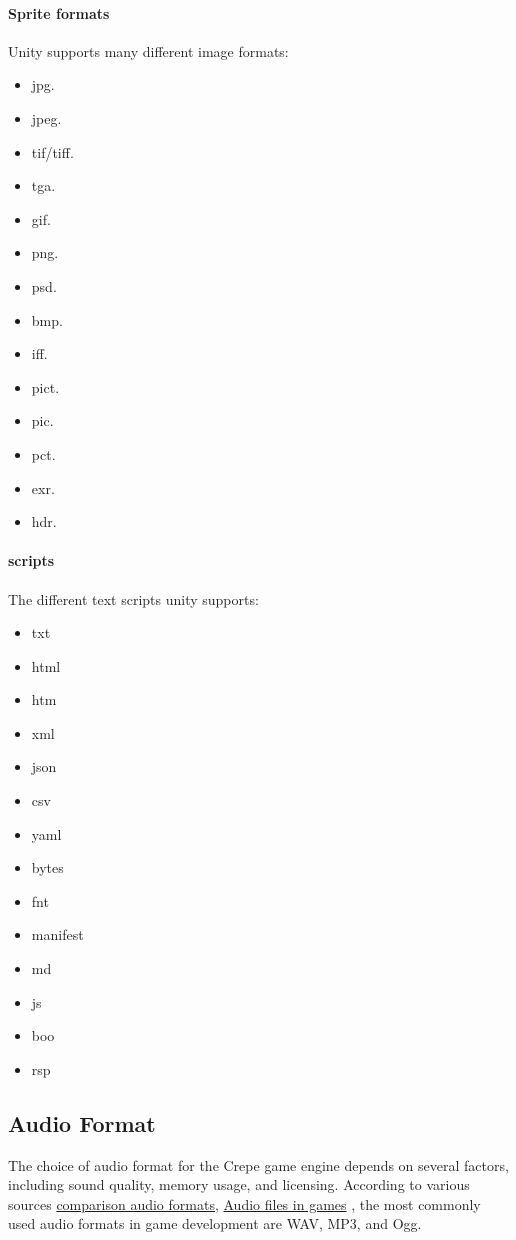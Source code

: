 \documentclass{projdoc}
\begin{document}
\paragraph{Sprite formats}

Unity supports many different image formats:
\begin{itemize}
	\item jpg.
	\item jpeg.
	\item tif/tiff.
	\item tga.
	\item gif.
	\item png.
	\item psd.
	\item bmp.
	\item iff.
	\item pict.
	\item pic.
	\item pct.
	\item exr.
	\item hdr.
\end{itemize}

\paragraph{scripts}
The different text scripts unity supports:
 \begin{itemize}
	 \item txt
	 \item html 
	 \item htm 
	 \item xml
	 \item json
	 \item csv
	 \item yaml
	 \item bytes
	 \item fnt 
	 \item manifest
	 \item md 
	 \item js
	 \item boo
	 \item rsp
 \end{itemize}

\subsection{Audio Format} The choice of audio format for the Crepe game engine depends on several factors, including sound quality, memory usage, and licensing. According to various sources \href{https://dev.to/tenry/comparison-of-audio-formats-for-games-jak}{comparison audio formats}, \href{https://www.universityofgames.net/articles/audio-file-formats-used-in-game-development/}{Audio files in games} , the most commonly used audio formats in game development are WAV, MP3, and Ogg.
\end{document}
